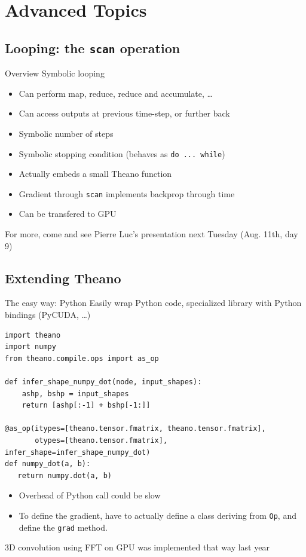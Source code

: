 \documentclass[a4paper,9pt]{beamer}
\begin{document}
\section{Advanced Topics}
\begin{frame}
  \tableofcontents[currentsection]
\end{frame}

\subsection{Looping: the {\tt scan} operation}
\begin{frame}[fragile]{Overview}
  Symbolic looping
  \begin{itemize}
    \item Can perform map, reduce, reduce and accumulate, \ldots
    \item Can access outputs at previous time-step, or further back
    \item Symbolic number of steps
    \item Symbolic stopping condition (behaves as \verb|do ... while|)
    \item Actually embeds a small Theano function
    \item Gradient through \verb|scan| implements backprop through time
    \item Can be transfered to GPU
  \end{itemize}
  For more, come and see Pierre Luc's presentation next Tuesday (Aug. 11th, day 9)
\end{frame}


\subsection{Extending Theano}

\begin{frame}[fragile]{The easy way: Python}
\small
  Easily wrap Python code, specialized library with Python bindings (PyCUDA, \ldots)

  \begin{verbatim}
import theano
import numpy
from theano.compile.ops import as_op

def infer_shape_numpy_dot(node, input_shapes):
    ashp, bshp = input_shapes
    return [ashp[:-1] + bshp[-1:]]

@as_op(itypes=[theano.tensor.fmatrix, theano.tensor.fmatrix],
       otypes=[theano.tensor.fmatrix], infer_shape=infer_shape_numpy_dot)
def numpy_dot(a, b):
   return numpy.dot(a, b)

  \end{verbatim}
  \begin{itemize}
    \item Overhead of Python call could be slow
    \item To define the gradient, have to actually define a class deriving from \verb|Op|,
      and define the \verb|grad| method.
  \end{itemize}
  3D convolution using FFT on GPU was implemented that way last year
\end{frame}
\end{document}
